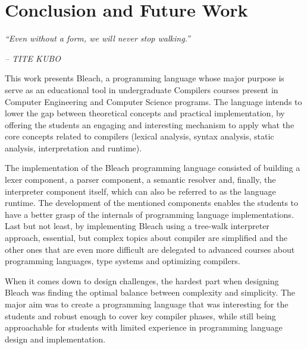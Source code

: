 \chapter{Conclusion and Future Work} \label{cap:conclusao}

\begin{displayquote}
    \begin{center}
        \textit{``Even without a form, we will never stop walking.''}
    \end{center}
\end{displayquote}

\begin{flushright}
   \textit{-- TITE KUBO}
\end{flushright}

This work presents Bleach, a programming language whose major purpose is serve as an educational tool in undergraduate Compilers courses present in Computer Engineering and Computer Science programs. The language intends to lower the gap between theoretical concepts and practical implementation, by offering the students an engaging and interesting mechanism to apply what the core concepts related to compilers (lexical analysis, syntax analysis, static analysis, interpretation and runtime).

The implementation of the Bleach programming language consisted of building a lexer component, a parser component, a semantic resolver and, finally, the interpreter component itself, which can also be referred to as the language runtime. The development of the mentioned components enables the students to have a better grasp of the internals of programming language implementations. Last but not least, by implementing Bleach using a tree-walk interpreter approach, essential, but complex topics about compiler are simplified and the other ones that are even more difficult are delegated to advanced courses about programming languages, type systems and optimizing compilers.

When it comes down to design challenges, the hardest part when designing Bleach was finding the optimal balance between complexity and simplicity. The major aim was to create a programming language that was interesting for the students and robust enough to cover key compiler phases, while still being approachable for students with limited experience in programming language design and implementation.

